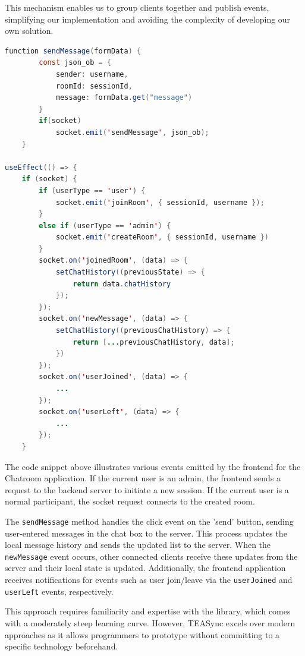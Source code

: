 This mechanism enables us to group clients together and publish events, simplifying our implementation and avoiding the complexity of developing our own solution.

\begin{lstlisting}[language=Java, caption=Data Synchronization in React Component, label=lst:java, mathescape=true]
function sendMessage(formData) {
        const json_ob = {
            sender: username,
            roomId: sessionId,
            message: formData.get("message")
        }
        if(socket)
            socket.emit('sendMessage', json_ob);
    }

useEffect(() => {
    if (socket) {
        if (userType == 'user') {
            socket.emit('joinRoom', { sessionId, username });
        }
        else if (userType == 'admin') {
            socket.emit('createRoom', { sessionId, username })
        }
        socket.on('joinedRoom', (data) => {
            setChatHistory((previousState) => {
                return data.chatHistory
            });
        });
        socket.on('newMessage', (data) => {
            setChatHistory((previousChatHistory) => {
                return [...previousChatHistory, data];
            })
        });
        socket.on('userJoined', (data) => {
            ...
        });
        socket.on('userLeft', (data) => {
            ...
        });
    }
\end{lstlisting}

The code snippet above illustrates various events emitted by the frontend for the Chatroom application. If the current user is an admin, the frontend sends a request to the backend server to initiate a new session. If the current user is a normal participant, the socket request connects to the created room.

The \lstinline{sendMessage} method handles the click event on the 'send' button, sending user-entered messages in the chat box to the server. This process updates the local message history and sends the updated list to the server. When the \lstinline{newMessage} event occurs, other connected clients receive these updates from the server and their local state is updated. Additionally, the frontend application receives notifications for events such as user join/leave via the \lstinline{userJoined} and \lstinline{userLeft} events, respectively.

This approach requires familiarity and expertise with the library, which comes with a moderately steep learning curve. However, TEASync excels over modern approaches as it allows programmers to prototype without committing to a specific technology beforehand.


